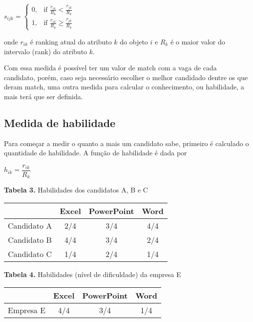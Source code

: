 \documentclass[]{article}
\begin{document}
	\begin{center}
	$ s_{ijk} = \begin{cases}
			0, &\text{if } \frac{r_{ik}}{R_k}  {} < \frac{r_{jk}}{R_k} \\
			1, &\text{if } \frac{r_{ik}}{R_k} \ge \frac{r_{jk}}{R_k} \end{cases} $
	\end{center}

	\noindent onde $r_{ik}$ é ranking atual do atributo $k$ do objeto $i$ e $R_k$ é o maior valor do intervalo (rank) do atributo $k$.
	
	Com essa medida é possível ter um valor de match com a vaga de cada candidato, porém, caso seja necessário escolher o melhor candidado dentre os que deram match, uma outra medida para calcular o conhecimento, ou habilidade, a mais terá que ser definida.
	
	\subsection{Medida de habilidade}
	    Para começar a medir o quanto a mais um candidato sabe, primeiro é calculado o quantidade de habilidade. A função de habilidade é dada por
	    
	\begin{center}
		$ h_{ik}= \dfrac{r_{ik}}{R_k} $
	\end{center}

	\begin{center}
		\noindent \textbf{Tabela 3.}
		\noindent Habilidades dos candidatos A, B e C
		
		\begin{tabular}{|c | c | c | c|} 
			\hline
			& Excel & PowerPoint & Word \\ [0.5ex] 
			\hline
			Candidato A & 2/4 & 3/4 & 4/4 \\
			\hline
			Candidato B & 4/4 & 3/4 & 2/4 \\
			\hline
			Candidato C & 1/4 & 2/4 & 1/4 \\
			\hline
		\end{tabular}
	\end{center}
	
	
	\begin{center}
		\noindent \textbf{Tabela 4.}
		\noindent Habilidades (nível de dificuldade) da empresa E
		
		\begin{tabular}{|c | c | c | c|} 
			\hline
			& Excel & PowerPoint & Word \\ [0.5ex] 
			\hline
			Empresa E & 4/4 & 3/4 & 1/4 \\
			\hline
		\end{tabular}
	\end{center}
\end{document}
